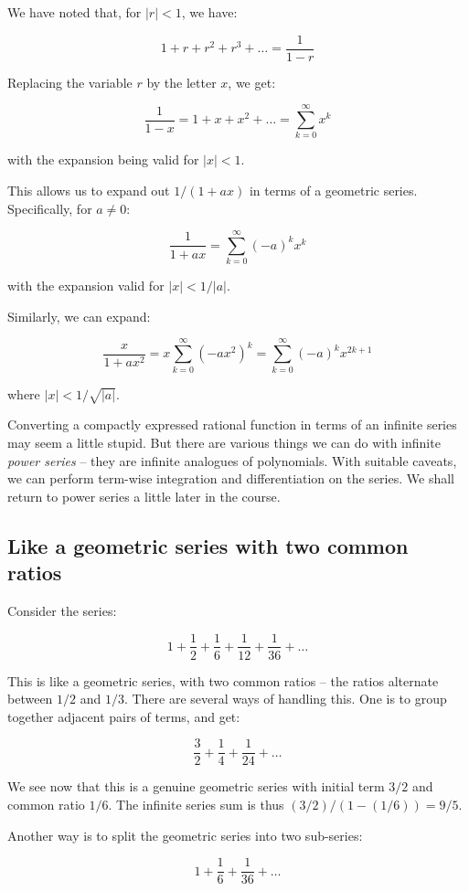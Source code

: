 \documentclass{amsart}
\begin{document}
We have noted that, for $|r| < 1$, we have:

$$1 + r + r^2 + r^3 + \dots = \frac{1}{1 - r}$$

Replacing the variable $r$ by the letter $x$, we get:

$$\frac{1}{1 - x} = 1 + x + x^2 + \dots = \sum_{k=0}^\infty x^k$$

with the expansion being valid for $|x| < 1$.

This allows us to expand out $1/(1 + ax)$ in terms of a geometric
series. Specifically, for $a \ne 0$:

$$\frac{1}{1 + ax} = \sum_{k=0}^\infty (-a)^kx^k$$

with the expansion valid for $|x| < 1/|a|$.

Similarly, we can expand:

$$\frac{x}{1 + ax^2} = x \sum_{k=0}^\infty (-ax^2)^k = \sum_{k=0}^\infty (-a)^kx^{2k + 1}$$

where $|x| < 1/\sqrt{|a|}$.

Converting a compactly expressed rational function in terms of an
infinite series may seem a little stupid. But there are various things
we can do with infinite {\em power series} -- they are infinite
analogues of polynomials. With suitable caveats, we can perform
term-wise integration and differentiation on the series. We shall
return to power series a little later in the course.

\subsection{Like a geometric series with two common ratios}

Consider the series:

$$1 + \frac{1}{2} + \frac{1}{6} + \frac{1}{12} + \frac{1}{36} + \dots$$

This is like a geometric series, with two common ratios -- the ratios
alternate between $1/2$ and $1/3$. There are several ways of handling
this. One is to group together adjacent pairs of terms, and get:

$$\frac{3}{2} + \frac{1}{4} + \frac{1}{24} + \dots$$

We see now that this is a genuine geometric series with initial term
$3/2$ and common ratio $1/6$. The infinite series sum is thus $(3/2)/(1 -
(1/6)) = 9/5$.

Another way is to split the geometric series into two sub-series:

$$1 + \frac{1}{6} + \frac{1}{36} + \dots$$
\end{document}
